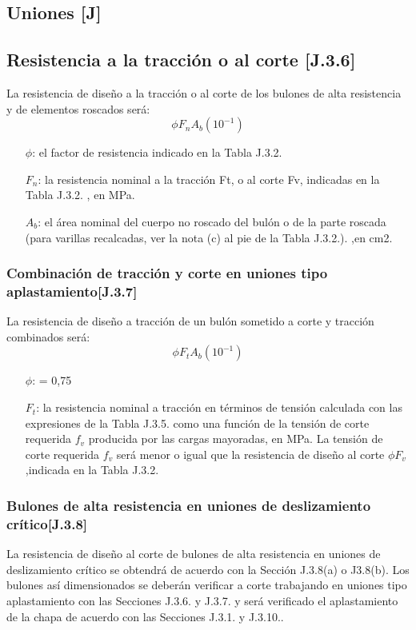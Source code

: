 \documentclass[twocolumn]{article}
\begin{document}
\subsection{Uniones [J]}

\subsection{Resistencia a la tracción o al corte [J.3.6]}
La resistencia de diseño a la tracción o al corte de los bulones de alta resistencia y de elementos roscados será:
\[
\phi F_n A_b (10^{-1})
\]
\begin{itemize}
	\item[$\phi$:] el factor de resistencia indicado en la Tabla J.3.2.
	\item[$F_n$:] la resistencia nominal a la tracción Ft, o al corte Fv, indicadas en la Tabla J.3.2. , en MPa.
	\item[$A_b$:] el área nominal del cuerpo no roscado del bulón o de la parte roscada (para varillas recalcadas, ver la nota (c) al pie de la Tabla J.3.2.). ,en cm2.
\end{itemize}

\subsubsection{Combinación de tracción y corte en uniones tipo aplastamiento[J.3.7]}
La resistencia de diseño a tracción de un bulón sometido a corte y tracción
combinados será:
\[
\phi F_t A_b (10^{-1})
\]

\begin{itemize}
	\item[$\phi$:] = 0,75
	\item[$F_t$:] la resistencia nominal a tracción en términos de tensión calculada con las expresiones de la Tabla J.3.5. como una función de la tensión de corte requerida $f_v$ producida por las cargas mayoradas, en MPa. La tensión de corte requerida $f_v$ será menor o igual que la resistencia de diseño al corte $\phi F_v$ ,indicada en la Tabla J.3.2.  
\end{itemize}

\subsubsection{Bulones de alta resistencia en uniones de deslizamiento crítico[J.3.8]}
La resistencia de diseño al corte de bulones de alta resistencia en uniones de deslizamiento crítico se obtendrá de acuerdo con la Sección J.3.8(a) o J3.8(b). Los bulones así dimensionados se deberán verificar a corte trabajando en uniones tipo aplastamiento con las Secciones J.3.6. y J.3.7. y será verificado el aplastamiento de la chapa de acuerdo con las Secciones J.3.1. y J.3.10..
\end{document}
